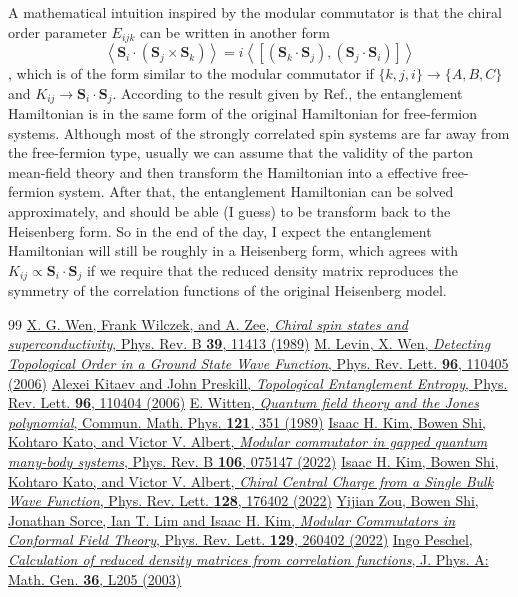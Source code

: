 \documentclass[12font]{article}
\theoremstyle{definition}
\numberwithin{equation}{section}
\newcommand{\anglelr}[1]{\left\langle #1 \right\rangle}
\newcommand{\lr}[1]{\left(  #1  \right)}
\newcommand{\bo}[1]{\mathbf{#1}}
\begin{document}
A mathematical intuition inspired by the modular commutator is that the chiral order parameter $E_{ijk}$ can be written in another form
\[
\anglelr{\bo{S}_i\cdot\lr{\bo{S}_j\times\bo{S}_k}} = i\anglelr{[(\bo{S}_k\cdot\bo{S}_j), (\bo{S}_j\cdot\bo{S}_i)]}
\]
, which is of the form similar to the modular commutator if $\{k,j,i\}\to\{A,B,C\}$ and $K_{ij} \to \bo{S}_i\cdot\bo{S}_j$. According to the result given by Ref.\cite{Peschel}, the entanglement Hamiltonian is in the same form of the original Hamiltonian for free-fermion systems. Although most of the strongly correlated spin systems are far away from the free-fermion type, usually we can assume that the validity of the parton mean-field theory and then transform the Hamiltonian into a effective free-fermion system. After that, the entanglement Hamiltonian can be solved approximately, and should be able (I guess) to be transform back to the Heisenberg form. So in the end of the day, I expect the entanglement Hamiltonian will still be  roughly in a Heisenberg form, which agrees with $K_{ij}\propto\bo{S}_{i}\cdot\bo{S}_j$ if we require that the reduced density matrix reproduces the symmetry of the correlation functions of the original Heisenberg model. 


\begin{thebibliography}{99}
    \href{https://doi.org/10.1103/PhysRevB.39.11413}{X. G. Wen, Frank Wilczek, and A. Zee, \emph{Chiral spin states and superconductivity}, Phys. Rev. B \textbf{39}, 11413 (1989)}
    \href{https://doi.org/10.1103/PhysRevLett.96.110405}{M. Levin, X. Wen, \emph{Detecting Topological Order in a Ground State Wave Function}, Phys. Rev. Lett. \textbf{96}, 110405 (2006)}
    \href{https://doi.org/10.1103/PhysRevLett.96.110404}{Alexei Kitaev and John Preskill, \emph{Topological Entanglement Entropy}, Phys. Rev. Lett. \textbf{96}, 110404 (2006)}
    \href{https://link.springer.com/article/10.1007/BF01217730}{E. Witten, \emph{Quantum field theory and the Jones polynomial}, Commun. Math. Phys. \textbf{121}, 351 (1989)}
    \href{https://doi.org/10.1103/PhysRevB.106.075147}{Isaac H. Kim, Bowen Shi, Kohtaro Kato, and Victor V. Albert, \emph{Modular commutator in gapped quantum many-body systems}, Phys. Rev. B \textbf{106}, 075147 (2022)}
    \href{https://doi.org/10.1103/PhysRevLett.128.176402}{Isaac H. Kim, Bowen Shi, Kohtaro Kato, and Victor V. Albert, \emph{Chiral Central Charge from a Single Bulk Wave Function}, Phys. Rev. Lett. \textbf{128}, 176402 (2022)}
    \href{https://doi.org/10.1103/PhysRevLett.129.260402}{Yijian Zou, Bowen Shi, Jonathan Sorce, Ian T. Lim and Isaac H. Kim, \emph{Modular Commutators in Conformal Field Theory}, Phys. Rev. Lett. \textbf{129}, 260402 (2022)}
    \href{https://doi.org/10.1088/0305-4470/36/14/101}{ Ingo Peschel, \emph{Calculation of reduced density matrices from correlation functions}, J. Phys. A: Math. Gen. \textbf{36}, L205 (2003)}
\end{thebibliography}
\end{document}
